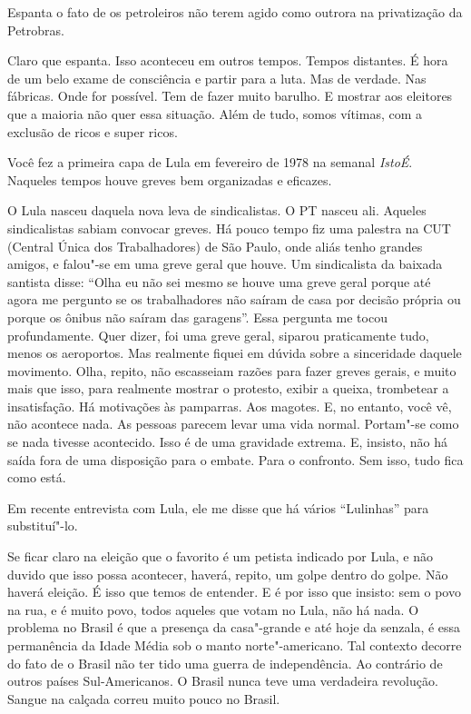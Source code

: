 \falaG Espanta o fato de os petroleiros não terem agido como outrora na
privatização da Petrobras.

\falaM Claro que espanta. Isso aconteceu em outros tempos. Tempos distantes.
É hora de um belo exame de consciência e partir para a luta. Mas de
verdade. Nas fábricas. Onde for possível. Tem de fazer muito barulho. E
mostrar aos eleitores que a maioria não quer essa situação. Além de
tudo, somos vítimas, com a exclusão de ricos e super ricos.

\falaG Você fez a primeira capa de Lula em fevereiro de 1978 na semanal
\emph{IstoÉ}. Naqueles tempos houve greves bem organizadas e eficazes.

\falaM O Lula nasceu daquela nova leva de sindicalistas. O PT nasceu ali.
Aqueles sindicalistas sabiam convocar greves. Há pouco tempo fiz uma
palestra na CUT (Central Única dos Trabalhadores) de São Paulo, onde
aliás tenho grandes amigos, e falou"-se em uma greve geral que houve. Um
sindicalista da baixada santista disse: ``Olha eu não sei mesmo se houve
uma greve geral porque até agora me pergunto se os trabalhadores não
saíram de casa por decisão própria ou porque os ônibus não saíram das
garagens''. Essa pergunta me tocou profundamente. Quer dizer, foi uma
greve geral, si\falaM parou praticamente tudo, menos os aeroportos. Mas
realmente fiquei em dúvida sobre a sinceridade daquele movimento. Olha,
repito, não escasseiam razões para fazer greves gerais, e muito mais que
isso, para realmente mostrar o protesto, exibir a queixa, trombetear a
insatisfação. Há motivações às pamparras. Aos magotes. E, no entanto,
você vê, não acontece nada. As pessoas parecem levar uma vida normal.
Portam"-se como se nada tivesse acontecido. Isso é de uma gravidade
extrema. E, insisto, não há saída fora de uma disposição para o embate.
Para o confronto. Sem isso, tudo fica como está.

\falaG Em recente entrevista com Lula, ele me disse que há vários
``Lulinhas'' para substituí"-lo.

\falaM Se ficar claro na eleição que o favorito é um petista indicado por
Lula, e não duvido que isso possa acontecer, haverá, repito, um golpe
dentro do golpe. Não haverá eleição. É isso que temos de entender. E é
por isso que insisto: sem o povo na rua, e é muito povo, todos aqueles
que votam no Lula, não há nada. O problema no Brasil é que a presença da
casa"-grande e até hoje da senzala, é essa permanência da Idade Média sob
o manto norte"-americano. Tal contexto decorre do fato de o Brasil não
ter tido uma guerra de independência. Ao contrário de outros países
Sul-Americanos. O Brasil nunca teve uma verdadeira revolução. Sangue na
calçada correu muito pouco no Brasil.

